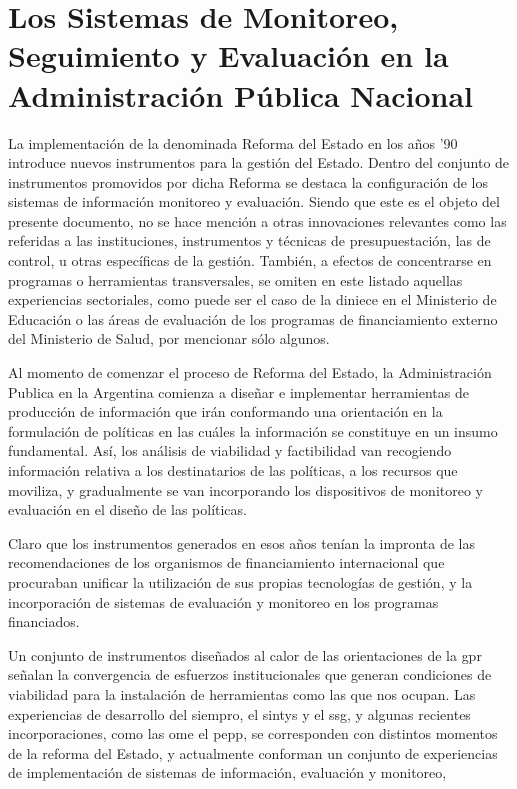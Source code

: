 \newpage
\section{Los Sistemas de Monitoreo, Seguimiento y Evaluación en la Administración Pública Nacional}\label{sistemas}

La implementación de la denominada Reforma del Estado en los años '90 introduce nuevos instrumentos para la gestión del Estado. Dentro del conjunto de instrumentos promovidos por dicha Reforma se destaca la configuración de los sistemas de información monitoreo y evaluación. Siendo que este es el objeto del presente documento, no se hace mención a otras innovaciones relevantes como las referidas a las instituciones, instrumentos y técnicas de presupuestación, las de control, u otras específicas de la gestión. También, a efectos de concentrarse en programas o herramientas transversales, se omiten en este listado aquellas experiencias sectoriales, como puede ser el caso de la \ac{diniece} en el Ministerio de Educación o las áreas de evaluación de los programas de financiamiento externo del Ministerio de Salud, por mencionar sólo algunos.

Al momento de comenzar el proceso de Reforma del Estado, la Administración Publica en la Argentina comienza a diseñar e implementar herramientas de producción de información que irán conformando una orientación en la formulación de políticas en las cuáles la información se constituye en un insumo fundamental. Así, los análisis de viabilidad y factibilidad van recogiendo información relativa a los destinatarios de las políticas, a los recursos que moviliza, y gradualmente se van incorporando los dispositivos de monitoreo y evaluación en el diseño de las políticas. 

Claro que los instrumentos generados en esos años tenían la impronta de las recomendaciones de los organismos de financiamiento internacional que procuraban unificar la utilización de sus propias tecnologías de gestión, y la incorporación de sistemas de evaluación y monitoreo en los programas financiados.

Un conjunto de instrumentos diseñados al calor de las orientaciones de la \ac{gpr} señalan la convergencia de esfuerzos institucionales que generan condiciones de viabilidad para la instalación de herramientas como las que nos ocupan. Las experiencias de desarrollo del \ac{siempro}, el \ac{sintys} y el \ac{ssg}, y algunas recientes incorporaciones, como las \ac{ome} el \ac{pepp}, se corresponden con distintos momentos de la reforma del Estado, y actualmente conforman un conjunto de experiencias de implementación de sistemas de información, evaluación y monitoreo,



